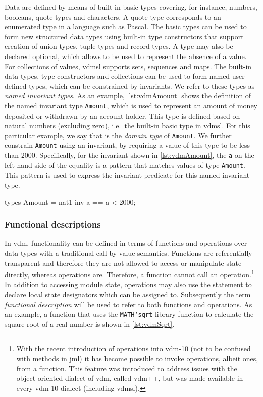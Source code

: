 Data are defined by means of built-in basic types covering, for
instance, numbers, booleans, quote types and characters. A quote type
corresponds to an enumerated type in a language such as Pascal. The
basic types can be used to form new structured data types using
built-in type constructors that support creation of union types, tuple
types and record types. A type may also be declared optional, which
allows  to be used to represent the absence of a value. For
collections of values, \ac{vdmsl} supports sets, sequences and
maps. The built-in data types, type constructors and collections can
be used to form named user defined types, which can be constrained by
invariants. We refer to these types as \emph{named invariant
  types}. As an example, \autoref{lst:vdmAmount} shows the definition
of the named invariant type \texttt{Amount}, which is used to
represent an amount of money deposited or withdrawn by an account
holder. This type is defined based on natural numbers (excluding
zero), i.e.\ the built-in basic type  in \ac{vdmsl}. For this
particular example, we say that  is the \emph{domain type} of
\texttt{Amount}. We further constrain \texttt{Amount} using an
invariant, by requiring a value of this type to be less than
2000. Specifically, for the invariant shown in
\autoref{lst:vdmAmount}, the \texttt{a} on the left-hand side of the
equality is a pattern that matches values of type
\texttt{Amount}. This pattern is used to express the invariant
predicate for this named invariant type.

\begin{vdmsl}[style=customVdm,caption={Example of a \ac{vdmsl} named invariant type.},label={lst:vdmAmount}]
types
Amount = nat1
inv a == a < 2000;
\end{vdmsl}

\subsubsection{Functional descriptions}
\label{sec:functional-descriptions}

In \ac{vdm}, functionality can be defined in terms of functions and
operations over data types with a traditional call-by-value semantics.
Functions are referentially transparent and therefore they are not
allowed to access or manipulate state directly, whereas operations
are. Therefore, a function cannot call an operation.\footnote{With the
  recent introduction of  operations into \ac{vdm}-10 (not to
  be confused with  methods in \ac{jml}) it has become
  possible to invoke operations, albeit  ones, from a
  function. This feature was introduced to address issues with the
  object-oriented dialect of \ac{vdm}, called \ac{vdm}++, but was made
  available in every \ac{vdm}-10 dialect (including \ac{vdmsl}).} In
addition to accessing module state, operations may also use the
 statement to declare local state designators which can be
assigned to. Subsequently the term \emph{functional description} will
be used to refer to both functions and operations. As an example, a
function that uses the \texttt{MATH`sqrt} library function to
calculate the square root of a real number is shown in
\autoref{lst:vdmSqrt}.

